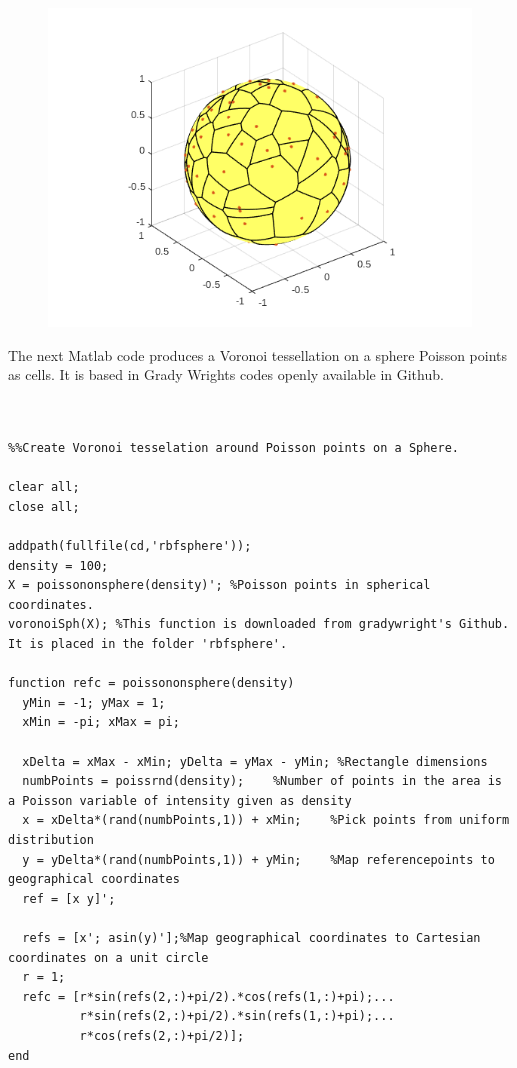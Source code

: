 \documentclass{article}
\begin{document}
\begin{figure}
  \includegraphics[width=\linewidth]{voronoionsphere.png}
\end{figure}


The next Matlab code produces a Voronoi tessellation on a sphere Poisson points as cells. It is based in Grady Wrights codes openly available in Github. 

\begin{verbatim}


%%Create Voronoi tesselation around Poisson points on a Sphere.

clear all;
close all;

addpath(fullfile(cd,'rbfsphere'));
density = 100;
X = poissononsphere(density)'; %Poisson points in spherical coordinates.
voronoiSph(X); %This function is downloaded from gradywright's Github. It is placed in the folder 'rbfsphere'.

function refc = poissononsphere(density)
  yMin = -1; yMax = 1;
  xMin = -pi; xMax = pi;
  
  xDelta = xMax - xMin; yDelta = yMax - yMin; %Rectangle dimensions
  numbPoints = poissrnd(density);    %Number of points in the area is a Poisson variable of intensity given as density
  x = xDelta*(rand(numbPoints,1)) + xMin;    %Pick points from uniform distribution
  y = yDelta*(rand(numbPoints,1)) + yMin;    %Map referencepoints to geographical coordinates
  ref = [x y]';

  refs = [x'; asin(y)'];%Map geographical coordinates to Cartesian coordinates on a unit circle
  r = 1;
  refc = [r*sin(refs(2,:)+pi/2).*cos(refs(1,:)+pi);...
          r*sin(refs(2,:)+pi/2).*sin(refs(1,:)+pi);...
          r*cos(refs(2,:)+pi/2)];
end

\end{verbatim}
\end{document}
